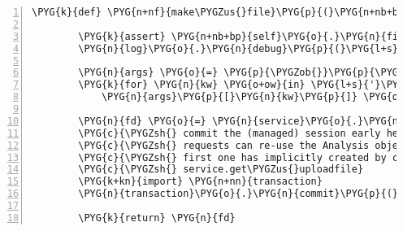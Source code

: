 \begin{Verbatim}[commandchars=\\\{\},numbers=left,firstnumber=1,stepnumber=5]
    \PYG{k}{def} \PYG{n+nf}{make\PYGZus{}file}\PYG{p}{(}\PYG{n+nb+bp}{self}\PYG{p}{,} \PYG{n}{binary}\PYG{o}{=}\PYG{n+nb+bp}{None}\PYG{p}{)}\PYG{p}{:}

        \PYG{k}{assert} \PYG{n+nb+bp}{self}\PYG{o}{.}\PYG{n}{filename}
        \PYG{n}{log}\PYG{o}{.}\PYG{n}{debug}\PYG{p}{(}\PYG{l+s}{"}\PYG{l+s}{FieldStoragx.make\PYGZus{}file(}\PYG{l+s+si}{\PYGZpc{}s}\PYG{l+s}{)}\PYG{l+s}{"} \PYG{o}{\PYGZpc{}} \PYG{n+nb+bp}{self}\PYG{o}{.}\PYG{n}{filename}\PYG{p}{)}

        \PYG{n}{args} \PYG{o}{=} \PYG{p}{\PYGZob{}}\PYG{p}{\PYGZcb{}}
        \PYG{k}{for} \PYG{n}{kw} \PYG{o+ow}{in} \PYG{l+s}{'}\PYG{l+s}{session}\PYG{l+s}{'}\PYG{p}{,} \PYG{l+s}{'}\PYG{l+s}{name}\PYG{l+s}{'}\PYG{p}{,} \PYG{l+s}{'}\PYG{l+s}{type}\PYG{l+s}{'}\PYG{p}{:}
            \PYG{n}{args}\PYG{p}{[}\PYG{n}{kw}\PYG{p}{]} \PYG{o}{=} \PYG{n+nb+bp}{self}\PYG{o}{.}\PYG{n}{environ}\PYG{p}{[}\PYG{l+s}{'}\PYG{l+s}{rnaseqlyse.upload\PYGZus{}}\PYG{l+s}{'} \PYG{o}{+} \PYG{n}{kw}\PYG{p}{]}

        \PYG{n}{fd} \PYG{o}{=} \PYG{n}{service}\PYG{o}{.}\PYG{n}{get\PYGZus{}uploadfile}\PYG{p}{(}\PYG{n}{DBSession}\PYG{p}{,} \PYG{o}{*}\PYG{o}{*}\PYG{n}{args}\PYG{p}{)}
        \PYG{c}{\PYGZsh{} commit the (managed) session early here, so later}
        \PYG{c}{\PYGZsh{} requests can re-use the Analysis object that the}
        \PYG{c}{\PYGZsh{} first one has implicitly created by calling}
        \PYG{c}{\PYGZsh{} service.get\PYGZus{}uploadfile}
        \PYG{k+kn}{import} \PYG{n+nn}{transaction}
        \PYG{n}{transaction}\PYG{o}{.}\PYG{n}{commit}\PYG{p}{(}\PYG{p}{)}

        \PYG{k}{return} \PYG{n}{fd}
\end{Verbatim}


